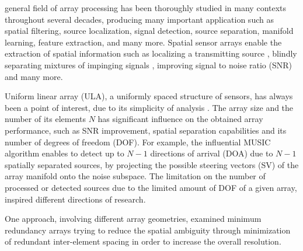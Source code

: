 general field of array processing has been thoroughly studied in many contexts throughout several decades, producing many important application such as spatial filtering, source localization, signal detection, source separation, manifold learning, feature extraction, and many more.
Spatial sensor arrays enable the extraction of spatial information such as localizing a transmitting source \cite{skolnik2008radar} , blindly separating mixtures of impinging signals \cite{Comon1994IndependentConcept} , improving signal to noise ratio (SNR) \cite{Frost1972AProcessing,verdu1998multiuser} and many more. 
\par Uniform linear array (ULA), a uniformly spaced structure of sensors, has always been a point of interest, due to its simplicity of analysis \cite{VanTrees2002DetectionIV}. 
The array size and the number of its elements $N$ has significant influence on the obtained array performance, such as SNR improvement, spatial separation capabilities and its number of degrees of freedom (DOF). For example, the influential MUSIC algorithm \cite{Ralph1986MultipleParameter} enables to detect up to $N-1$ directions of arrival (DOA) due to $N-1$ spatially separated sources, by projecting the possible steering vectors (SV) of the array manifold onto the noise subspace.
The limitation on the number of processed or detected sources due to the limited amount of DOF of a given array, inspired different directions of research. 
\par One approach, involving different array geometries, examined minimum redundancy arrays \cite{Moffet1968Minimum-RedundancyArrays,Pillai1985AEstimation,UnnikrishnaPillai1987StatisticalMatrix}  trying to reduce the spatial ambiguity through minimization of redundant inter-element spacing in order to increase the overall resolution. 
